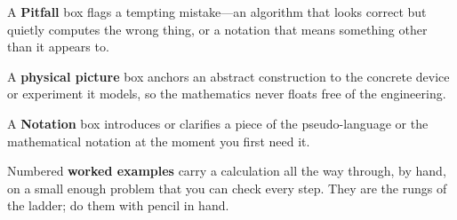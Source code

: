 \begin{pitfall}
A \textbf{Pitfall} box flags a tempting mistake---an algorithm that looks
correct but quietly computes the wrong thing, or a notation that means something
other than it appears to.
\end{pitfall}

\begin{physicsbox}
A \textbf{physical picture} box anchors an abstract construction to the concrete
device or experiment it models, so the mathematics never floats free of the
engineering.
\end{physicsbox}

\begin{notationbox}
A \textbf{Notation} box introduces or clarifies a piece of the pseudo-language
or the mathematical notation at the moment you first need it.
\end{notationbox}

\noindent Numbered \textbf{worked examples} carry a calculation all the way
through, by hand, on a small enough problem that you can check every step. They
are the rungs of the ladder; do them with pencil in hand.
